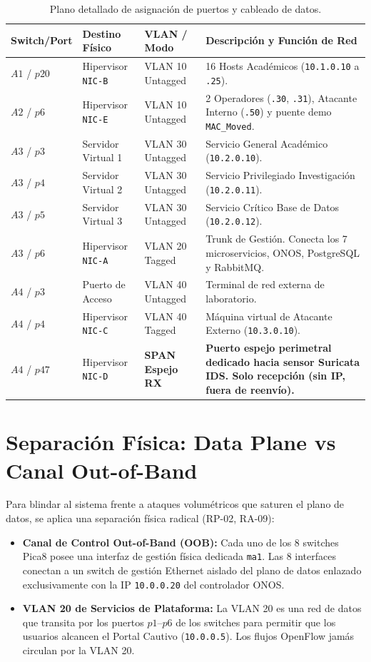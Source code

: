 \documentclass[11pt,a4paper]{report}
\begin{document}
\begin{table}[h!]
\centering
\small
\begin{tabularx}{\linewidth}{p{1.8cm}p{3.2cm}p{2.5cm}X}
\toprule
\textbf{Switch/Port} & \textbf{Destino Físico} & \textbf{VLAN / Modo} & \textbf{Descripción y Función de Red} \\
\midrule
$A1$ / $p20$ & Hipervisor \texttt{NIC-B} & VLAN 10 Untagged & 16 Hosts Académicos (\texttt{10.1.0.10} a \texttt{.25}). \\
$A2$ / $p6$ & Hipervisor \texttt{NIC-E} & VLAN 10 Untagged & 2 Operadores (\texttt{.30}, \texttt{.31}), Atacante Interno (\texttt{.50}) y puente demo \texttt{MAC\_Moved}. \\
$A3$ / $p3$ & Servidor Virtual 1 & VLAN 30 Untagged & Servicio General Académico (\texttt{10.2.0.10}). \\
$A3$ / $p4$ & Servidor Virtual 2 & VLAN 30 Untagged & Servicio Privilegiado Investigación (\texttt{10.2.0.11}). \\
$A3$ / $p5$ & Servidor Virtual 3 & VLAN 30 Untagged & Servicio Crítico Base de Datos (\texttt{10.2.0.12}). \\
$A3$ / $p6$ & Hipervisor \texttt{NIC-A} & VLAN 20 Tagged & Trunk de Gestión. Conecta los 7 microservicios, ONOS, PostgreSQL y RabbitMQ. \\
$A4$ / $p3$ & Puerto de Acceso & VLAN 40 Untagged & Terminal de red externa de laboratorio. \\
$A4$ / $p4$ & Hipervisor \texttt{NIC-C} & VLAN 40 Tagged & Máquina virtual de Atacante Externo (\texttt{10.3.0.10}). \\
$A4$ / $p47$ & Hipervisor \texttt{NIC-D} & \textbf{SPAN Espejo RX} & \textbf{Puerto espejo perimetral dedicado hacia sensor Suricata IDS. Solo recepción (sin IP, fuera de reenvío).} \\
\bottomrule
\end{tabularx}
\caption{Plano detallado de asignación de puertos y cableado de datos.}
\label{tab:puertos}
\end{table}

\section{Separación Física: Data Plane vs Canal Out-of-Band}
Para blindar al sistema frente a ataques volumétricos que saturen el plano de datos, se aplica una separación física radical (RP-02, RA-09):
\begin{itemize}[leftmargin=*]
    \item \textbf{Canal de Control Out-of-Band (OOB):} Cada uno de los 8 switches Pica8 posee una interfaz de gestión física dedicada \texttt{ma1}. Las 8 interfaces conectan a un switch de gestión Ethernet aislado del plano de datos enlazado exclusivamente con la IP \texttt{10.0.0.20} del controlador ONOS.
    \item \textbf{VLAN 20 de Servicios de Plataforma:} La VLAN 20 es una red de datos que transita por los puertos $p1$--$p6$ de los switches para permitir que los usuarios alcancen el Portal Cautivo (\texttt{10.0.0.5}). Los flujos OpenFlow jamás circulan por la VLAN 20.
\end{itemize}
\end{document}
